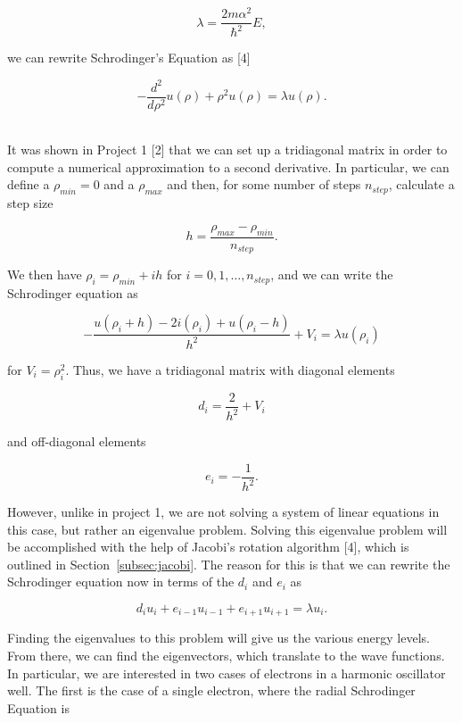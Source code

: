 \documentclass[12pt]{article}
\numberwithin{equation}{section}
\begin{document}
$$\lambda=\frac{2m\alpha^{2}}{\hbar^{2}}E,$$

\noindent we can rewrite Schrodinger's Equation as [4]

\begin{equation}
\label{eq:schrodfinal}
-\frac{d^{2}}{d\rho^{2}}u\left(\rho\right)+\rho^{2}u\left(\rho\right)=\lambda u\left(\rho\right).
\end{equation}
  
\\\indent It was shown in Project 1 [2] that we can set up a tridiagonal matrix in order to compute a numerical approximation to a second derivative.  In particular, we can define a $\rho_{min}=0$ and a $\rho_{max}$ and then, for some number of steps $n_{step}$, calculate a step size

$$h=\frac{\rho_{max}-\rho_{min}}{n_{step}}.$$

\noindent We then have $\rho_{i}=\rho_{min}+ih$ for $i=0,1,\ldots,n_{step}$, and we can write the Schrodinger equation as

\begin{equation}
\label{eq:schrodapprox}
-\frac{u\left(\rho_{i}+h\right)-2i\left(\rho_{i}\right)+u\left(\rho_{i}-h\right)}{h^{2}}+V_{i}=\lambda u\left(\rho_{i}\right)
\end{equation}

\noindent for $V_{i}=\rho_{i}^{2}$.  Thus, we have a tridiagonal matrix with diagonal elements

$$d_{i}=\frac{2}{h^{2}}+V_{i}$$

\noindent and off-diagonal elements

$$e_{i}=-\frac{1}{h^{2}}.$$

\noindent However, unlike in project 1, we are not solving a system of linear equations in this case, but rather an eigenvalue problem.  Solving this eigenvalue problem will be accomplished with the help of Jacobi's rotation algorithm [4], which is outlined in Section~\ref{subsec:jacobi}.  The reason for this is that we can rewrite the Schrodinger equation now in terms of the $d_{i}$ and $e_{i}$ as 

$$d_{i}u_{i}+e_{i-1}u_{i-1}+e_{i+1}u_{i+1}=\lambda u_{i}.$$

\noindent Finding the eigenvalues to this problem will give us the various energy levels.  From there, we can find the eigenvectors, which translate to the wave functions.
\\\indent In particular, we are interested in two cases of electrons in a harmonic oscillator well.  The first is the case of a single electron, where the radial Schrodinger Equation is 
\end{document}
